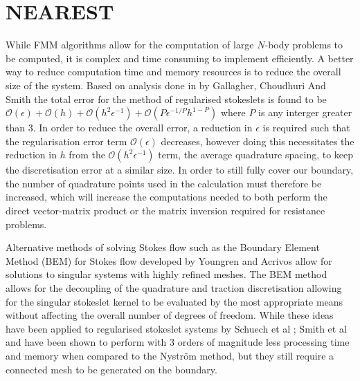 \FloatBarrier
\section{NEAREST} \label{sec:NEAREST}
While FMM algorithms allow for the computation of large $N$-body problems to be computed, it is complex and time consuming to implement efficiently. A better way to reduce computation time and memory resources is to reduce the overall size of the system. Based on analysis done in by Gallagher, Choudhuri And Smith \cite{Gallagher2019SharpEquation} the total error for the method of regularised stokeslets is found to be $\mathcal{O}(\epsilon) + \mathcal{O}(h) + \mathcal{O}(h^2\epsilon^{-1}) + \mathcal{O}(P\epsilon^{-1/P} h^{1-P})$ where $P$ is any interger greater than 3. In order to reduce the overall error, a reduction in $\epsilon$ is required such that the regularisation error term $\mathcal{O}(\epsilon)$ decreases, however doing this necessitates the reduction in $h$ from the $\mathcal{O}(h^2\epsilon^{-1})$ term, the average quadrature spacing, to keep the discretisation error at a similar size. In order to still fully cover our boundary, the number of quadrature points used in the calculation must therefore be increased, which will increase the computations needed to both perform the direct vector-matrix product or the matrix inversion required for resistance problems. 

Alternative methods of solving Stokes flow such as the Boundary Element Method (BEM) for Stokes flow developed by Youngren and Acrivos \cite{Acrivos1975StokesSolution} allow for solutions to singular systems with highly refined meshes. The BEM method allows for the decoupling of the quadrature and traction discretisation allowing for the singular stokeslet kernel to be evaluated by the most appropriate means without affecting the overall number of degrees of freedom. While these ideas have been applied to regularised stokeslet systems by Schuech et al \cite{SchuechMotilePareto-optimal}; Smith et al \cite{Smith2009AFlow} and have been shown to perform with 3 orders of magnitude less processing time and memory when compared to the Nyström method, but they still require a connected mesh to be generated on the boundary. 

